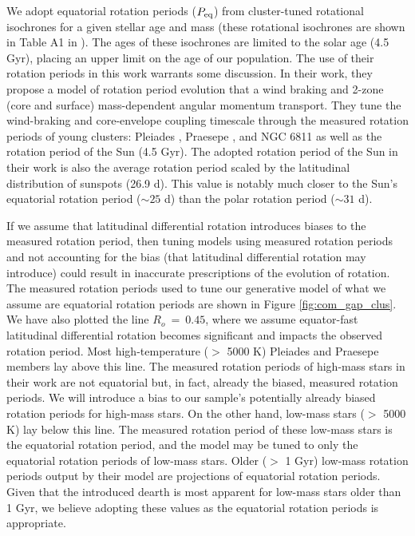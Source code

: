 We adopt equatorial rotation periods ($P_{\rm{eq}}$) from cluster-tuned rotational isochrones for a given stellar age and mass (these rotational isochrones are shown in Table A1 in \citet{spada_competing_2020}).
The ages of these isochrones are limited to the solar age (4.5 Gyr), placing an upper limit on the age of our population.
The use of their rotation periods in this work warrants some discussion.
In their work, they propose a model of rotation period evolution that a wind braking and 2-zone (core and surface) mass-dependent angular momentum transport.
They tune the wind-braking and core-envelope coupling timescale through the measured rotation periods of young clusters: Pleiades \citep[120 Myr;][]{rebull_rotation_2016}, Praesepe \citep[700 Myr;][]{douglas_poking_2017, douglas_k2_2019}, and NGC 6811 \citep[1 Gyr;][]{curtis_temporary_2019} as well as the rotation period of the Sun (4.5 Gyr).
The adopted rotation period of the Sun in their work is also the average rotation period scaled by the latitudinal distribution of sunspots (26.9 d).
This value is notably much closer to the Sun's equatorial rotation period ($\sim 25$ d) than the polar rotation period ($\sim 31$ d).

If we assume that latitudinal differential rotation introduces biases to the measured rotation period, then tuning models using measured rotation periods and not accounting for the bias (that latitudinal differential rotation may introduce) could result in inaccurate prescriptions of the evolution of rotation.
The measured rotation periods used to tune our generative model of what we assume are equatorial rotation periods are shown in Figure \ref{fig:com_gap_clus}.
We have also plotted the line $R_o \ = \ 0.45$, where we assume equator-fast latitudinal differential rotation becomes significant and impacts the observed rotation period.
Most high-temperature ($>$ 5000 K) Pleiades and Praesepe members lay above this line.
The measured rotation periods of high-mass stars in their work are not equatorial but, in fact, already the biased, measured rotation periods.
We will introduce a bias to our sample's potentially already biased rotation periods for high-mass stars.
On the other hand, low-mass stars ($>$ 5000 K) lay below this line.
The measured rotation period of these low-mass stars is the equatorial rotation period, and the model may be tuned to only the equatorial rotation periods of low-mass stars.
Older ($>$ 1 Gyr) low-mass rotation periods output by their model are projections of equatorial rotation periods.
Given that the introduced dearth is most apparent for low-mass stars older than 1 Gyr, we believe adopting these values as the equatorial rotation periods is appropriate.

